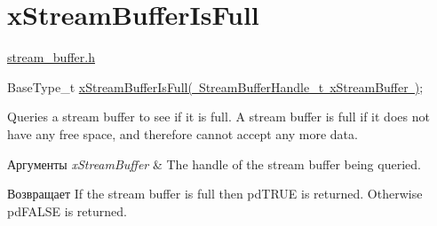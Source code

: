 \hypertarget{group__x_stream_buffer_is_full}{}\section{x\+Stream\+Buffer\+Is\+Full}
\label{group__x_stream_buffer_is_full}
\mbox{\hyperlink{stream__buffer_8h}{stream\+\_\+buffer.\+h}}


\begin{DoxyPre}
BaseType\_t \mbox{\hyperlink{stream__buffer_8h_ae393d82ee06e89692248a4381f85dc86}{xStreamBufferIsFull( StreamBufferHandle\_t xStreamBuffer )}};
\end{DoxyPre}


Queries a stream buffer to see if it is full. A stream buffer is full if it does not have any free space, and therefore cannot accept any more data.


\begin{DoxyParams}{Аргументы}
{\em x\+Stream\+Buffer} & The handle of the stream buffer being queried.\\
\hline
\end{DoxyParams}
\begin{DoxyReturn}{Возвращает}
If the stream buffer is full then pd\+T\+R\+UE is returned. Otherwise pd\+F\+A\+L\+SE is returned. 
\end{DoxyReturn}
